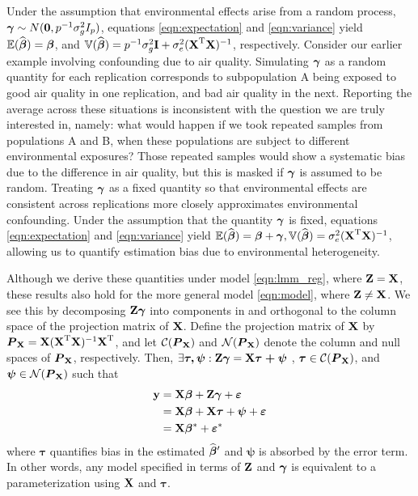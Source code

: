 Under the assumption that environmental effects arise from a random process, $\boldsymbol{\gamma} \sim N(\boldsymbol{0}, p^{-1} \sigma^2_g I_p)$, equations \eqref{eqn:expectation} and \eqref{eqn:variance} yield $\mathbb{E}(\widehat{\boldsymbol{\beta}{}}) = \boldsymbol{\beta}{}$, and $\mathbb{V}(\widehat{\boldsymbol{\beta}{}}) = p^{-1}\sigma^2_g\textbf{I} + \sigma^2_e (\textbf{X}^{\text{T}} \textbf{X})^{-1}$, respectively. Consider our earlier example involving confounding due to air quality. Simulating $\boldsymbol{\gamma}$ as a random quantity for each replication corresponds to subpopulation A being exposed to good air quality in one replication, and bad air quality in the next. Reporting the average across these situations is inconsistent with the question we are truly interested in, namely: what would happen if we took repeated samples from populations A and B, when these populations are subject to different environmental exposures? Those repeated samples would show a systematic bias due to the difference in air quality, but this is masked if $\boldsymbol{\gamma}$ is assumed to be random. Treating $\boldsymbol{\gamma}$ as a fixed quantity so that environmental effects are consistent across replications more closely approximates environmental confounding. Under the assumption that the quantity $\boldsymbol{\gamma}$ is fixed, equations \eqref{eqn:expectation} and \eqref{eqn:variance} yield $\mathbb{E}(\widehat{\boldsymbol{\beta}{}}) = \boldsymbol{\beta}{} + \boldsymbol{\gamma}, \mathbb{V}(\widehat{\boldsymbol{\beta}{}}) = \sigma^2_e (\textbf{X}^{\text{T}} \textbf{X})^{-1}$, allowing us to quantify estimation bias due to environmental heterogeneity. 

Although we derive these quantities under model \eqref{eqn:lmm_reg}, where $\textbf{Z} = \textbf{X}$, these results also hold for the more general model \eqref{eqn:model}, where $\textbf{Z} \ne \textbf{X}$. We see this by decomposing $\textbf{Z} \boldsymbol{\gamma}$ into components in and orthogonal to the column space of the projection matrix of $\textbf{X}$. Define the projection matrix of $\textbf{X}$ by $\boldsymbol{P}_{\textbf{X}} = \textbf{X} (\textbf{X}^{\text{T}} \textbf{X})^{-1} \textbf{X}^{\text{T}}$, and let $\mathcal{C}(\boldsymbol{P}_{\textbf{X}})$ and $\mathcal{N}(\boldsymbol{P}_{\textbf{X}})$ denote the column and null spaces of $\boldsymbol{P}_{\textbf{X}}$, respectively. Then, $\exists \boldsymbol{\tau, \psi}: \textbf{Z} \boldsymbol{\gamma} = \textbf{X} \boldsymbol{\tau + \psi}$ , $\boldsymbol{\tau} \in \mathcal{C}(\boldsymbol{P}_{\textbf{X}})$, and $\boldsymbol{\psi} \in \mathcal{N}(\boldsymbol{P}_{\textbf{X}})$ such that
\begin{align*}
    \textbf{y} &= \textbf{X}\boldsymbol{\beta}{} + \textbf{Z}\boldsymbol{\gamma} + \boldsymbol{\varepsilon}{}\\
    &= \textbf{X}\boldsymbol{\beta}{} + \textbf{X} \boldsymbol{\tau} + \boldsymbol{\psi} + \boldsymbol{\varepsilon}{}\\
    &=  \textbf{X} \boldsymbol{\beta}{}{^*} + \boldsymbol{\varepsilon}{}{^*}
\end{align*}
where $\boldsymbol{\tau}$ quantifies bias in the estimated $\widehat{\boldsymbol{\beta}{}}{^\prime}$ and $\boldsymbol{\psi}$ is absorbed by the error term. In other words, any model specified in terms of $\textbf{Z}$ and $\boldsymbol{\gamma}$ is equivalent to a parameterization using $\textbf{X}$ and $\boldsymbol{\tau}$.

